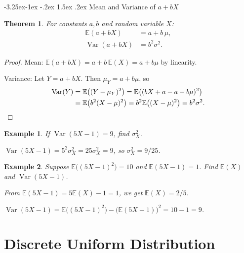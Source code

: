 \documentclass{article}
\makeatletter
\newtheorem{theorem}{Theorem}[section]
\newtheorem{example}{Example}[section]
\theoremstyle{remark}
\newlength{\subsecindent}
\renewcommand\subsection{\@startsection{subsection}{2}{\subsecindent}%
  {-3.25ex\@plus -1ex \@minus -.2ex}%
  {1.5ex \@plus .2ex}%
  {\normalfont\large\bfseries}}
\newenvironment{sub}{%
  \begin{list}{}{%
    \setlength{\leftmargin}{4em}%
    \setlength{\rightmargin}{0pt}%
    \setlength{\topsep}{0pt}%
    \setlength{\partopsep}{0pt}%
    \setlength{\parsep}{\parskip}%
    \setlength{\itemsep}{\parskip}%
  }\item\relax
}{\end{list}}
\newcommand{\E}{\mathbb{E}}
\newcommand{\Var}{\operatorname{Var}}
\makeatother
\begin{document}
\subsection{Mean and Variance of $a + bX$}
\begin{sub}

\begin{theorem}
  \label{thm:linear-transform}
  For constants $a, b$ and random variable $X$:
  \begin{align}
    \E(a + bX) &= a + b\,\mu, \label{eq:linear-mean} \\
    \Var(a + bX) &= b^2 \sigma^2. \label{eq:linear-var}
  \end{align}
\end{theorem}

\begin{proof}
  Mean: $\E(a + bX) = a + b\,\E(X) = a + b\mu$ by linearity.

  Variance: Let $Y = a + bX$. Then $\mu_Y = a + b\mu$, so
  \begin{align*}
    \Var(Y) &= \E\bigl((Y - \mu_Y)^2\bigr) = \E\bigl((bX + a - a - b\mu)^2\bigr) \\
            &= \E\bigl(b^2(X - \mu)^2\bigr) = b^2 \E\bigl((X-\mu)^2\bigr) = b^2 \sigma^2. \qedhere
  \end{align*}
\end{proof}

\begin{example}
  If $\Var(5X - 1) = 9$, find $\sigma_X^2$.

  $\Var(5X - 1) = 5^2 \sigma_X^2 = 25\sigma_X^2 = 9$, so $\sigma_X^2 = 9/25$.
\end{example}

\begin{example}
  Suppose $\E\bigl((5X-1)^2\bigr) = 10$ and $\E(5X - 1) = 1$. Find $\E(X)$ and $\Var(5X-1)$.

  From $\E(5X - 1) = 5\E(X) - 1 = 1$, we get $\E(X) = 2/5$.

  $\Var(5X - 1) = \E\bigl((5X-1)^2\bigr) - \bigl(\E(5X-1)\bigr)^2 = 10 - 1 = 9$.
\end{example}

\end{sub}

\section{Discrete Uniform Distribution}
\label{sec:det-uniform}
\end{document}

